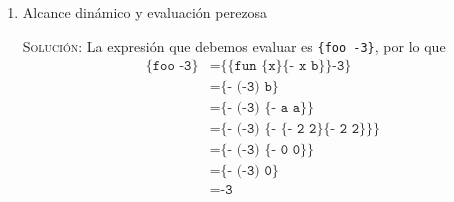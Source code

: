 \documentclass[letterpaper,11pt]{article}
\begin{document}
\begin{enumerate}
\begin{enumerate}
        \item Alcance dinámico y evaluación perezosa

        \textsc{Solución:} La expresión que debemos evaluar es 
        \texttt{\{foo -3\}}, por lo que 
        \begin{align*}
            \texttt{\{foo -3\}}
            &= \texttt{\{\{fun \{x\} \{- x b\}\} -3\}} \\
            &= \texttt{\{- (-3) b\}} \\
            &= \texttt{\{- (-3) \{- a a\}\}} \\
            &= \texttt{\{- (-3) \{- \{- 2 2\} \{- 2 2\}\}\}} \\
            &= \texttt{\{- (-3) \{- 0 0\}\}} \\
            &= \texttt{\{- (-3) 0\}} \\
            &= \texttt{-3}
        \end{align*}
        \begin{center}
            \begin{drawstack}[scale=1.15]
            \end{drawstack}
        \end{center}
    \end{enumerate}
\end{enumerate}
\end{document}
